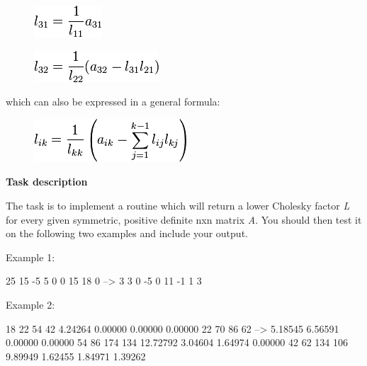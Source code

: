 \begin{figure}[H]
\centering
\includegraphics[scale=.6]{graphics/bdd8a535c6a8470767849ade18412c6d.png}
\end{figure}

\begin{figure}[H]
\centering
\includegraphics[scale=.6]{graphics/8c7f6df9ddc2c13f56a13ca113710587.png}
\end{figure}

which can also be expressed in a general formula:

\begin{figure}[H]
\centering
\includegraphics[scale=.6]{graphics/a404f9cdcc88e086294f604a41599f92.png}
\end{figure}

\textbf{Task description}

The task is to implement a routine which will return a lower Cholesky
factor \emph{L} for every given symmetric, positive definite nxn matrix
\emph{A}. You should then test it on the following two examples and
include your output.

Example 1:

\begin{wideverbatim}
25  15  -5                 5   0   0
15  18   0         -->     3   3   0
-5   0  11                -1   1   3
\end{wideverbatim}

Example 2:

\begin{wideverbatim}
18  22   54   42           4.24264    0.00000    0.00000    0.00000
22  70   86   62   -->     5.18545    6.56591    0.00000    0.00000
54  86  174  134          12.72792    3.04604    1.64974    0.00000
42  62  134  106           9.89949    1.62455    1.84971    1.39262
\end{wideverbatim}


